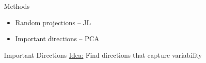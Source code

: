 \documentclass[14pt]{beamer}
\begin{document}
\begin{frame}{Methods}
  \begin{itemize}
  \item Random projections -- JL
  \item Important directions -- PCA
  \end{itemize}
\end{frame}

\begin{frame}{Important Directions}
  \huge\underline{Idea:} Find directions that capture variability
\end{frame}

\end{document}
